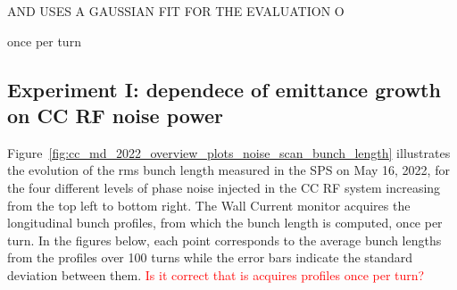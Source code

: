  
 AND USES A GAUSSIAN FIT FOR THE EVALUATION O
 
 once per turn



 \subsection{Experiment I: dependece of emittance growth on CC RF noise power}\label{subsec:2022_exp1_bunch_length}
 Figure~\ref{fig:cc_md_2022_overview_plots_noise_scan_bunch_length} illustrates the evolution of the rms bunch length measured in the SPS on May 16, 2022, for the four different levels of phase noise injected in the CC RF system increasing from the top left to bottom right. The Wall Current monitor acquires the longitudinal bunch profiles, from which the bunch length is computed, once per turn. In the figures below, each point corresponds to the average bunch lengths from the profiles over 100 turns while the error bars indicate the standard deviation between them. \textcolor{red}{Is it correct that is acquires profiles once per turn?}

